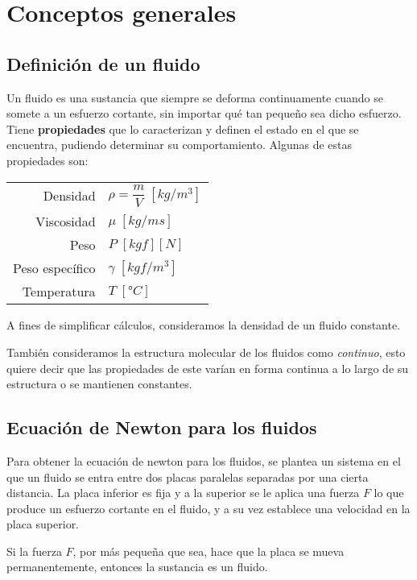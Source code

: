 \section{Conceptos generales}

\subsection{Definición de un fluido}
Un fluido es una sustancia que siempre se deforma continuamente cuando se somete a un esfuerzo cortante, sin importar qué tan pequeño sea dicho esfuerzo.\\

Tiene \textbf{propiedades} que lo caracterizan y definen el estado en el que se encuentra, pudiendo determinar su comportamiento. Algunas de estas propiedades son: \\
\begin{center}
	\begin{tabular} {r l}
		Densidad & $\rho = \dfrac{m}{V} \;[kg/m^3]$ \\
		Viscosidad & $\mu \;[kg/m s]$ \\
		Peso & $P \;[kgf] [N]$\\
		Peso específico & $\gamma \;[kgf/m^3]$ \\
		Temperatura & $T \;[°C]$ \\
	\end{tabular}
\end{center}

A fines de simplificar cálculos, consideramos la densidad de un fluido constante.

También consideramos la estructura molecular de los fluidos como \emph{continuo}, esto quiere decir que las propiedades de este varían en forma continua a lo largo de su estructura o se mantienen constantes.


\subsection{Ecuación de Newton para los fluidos}
Para obtener la ecuación de newton para los fluidos, se plantea un sistema en el que un fluido se entra entre dos placas paralelas separadas por una cierta distancia. La placa inferior es fija y a la superior se le aplica una fuerza $F$ lo que produce un esfuerzo cortante en el fluido, y a su vez establece una velocidad en la placa superior.

Si la fuerza $F$, por más pequeña que sea, hace que la placa se mueva permanentemente, entonces la sustancia es un fluido.

